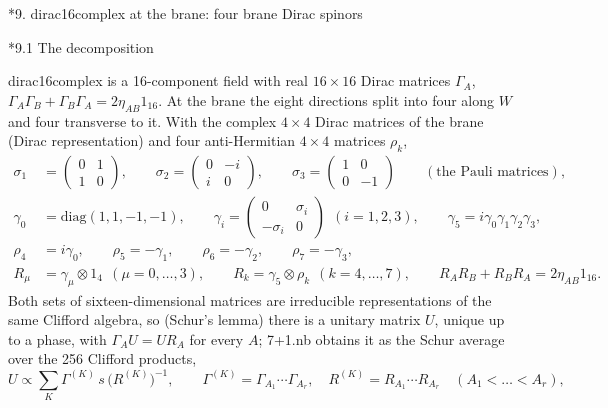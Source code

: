 \documentclass[10pt,a4paper]{article}
\makeatletter
\renewcommand\section{\@startsection{section}{1}{\z@}{-3.5ex \@plus -1ex \@minus -.2ex}{2.3ex \@plus.2ex}{\normalfont\Large\bfseries\raggedright}}
\renewcommand\subsection{\@startsection{subsection}{2}{\z@}{-3.25ex\@plus -1ex \@minus -.2ex}{1.5ex \@plus .2ex}{\normalfont\large\bfseries\raggedright}}
\makeatother
\begin{document}
\section*{9. dirac16complex at the brane: four brane Dirac spinors}
\subsection*{9.1 The decomposition}
dirac16complex is a 16-component field with real $16\times16$ Dirac matrices $\Gamma_A$, $\Gamma_A\Gamma_B+\Gamma_B\Gamma_A=2\eta_{AB}1_{16}$. At the brane the eight directions split into four along $W$ and four transverse to it. With the complex $4\times4$ Dirac matrices of the brane (Dirac representation) and four anti-Hermitian $4\times4$ matrices $\rho_k$,
\begin{align*}
\sigma_1&=\begin{pmatrix}0&1\\1&0\end{pmatrix},\qquad \sigma_2=\begin{pmatrix}0&-i\\i&0\end{pmatrix},\qquad \sigma_3=\begin{pmatrix}1&0\\0&-1\end{pmatrix}\qquad(\text{the Pauli matrices}), \\
\gamma_0&=\mathrm{diag}(1,1,-1,-1),\qquad \gamma_i=\begin{pmatrix}0&\sigma_i\\-\sigma_i&0\end{pmatrix}\ \ (i=1,2,3),\qquad \gamma_5=i\gamma_0\gamma_1\gamma_2\gamma_3, \\
\rho_4&=i\gamma_0,\qquad \rho_5=-\gamma_1,\qquad \rho_6=-\gamma_2,\qquad \rho_7=-\gamma_3, \\
R_\mu&=\gamma_\mu\otimes1_4\ \ (\mu=0,\dots,3),\qquad R_k=\gamma_5\otimes\rho_k\ \ (k=4,\dots,7),\qquad R_AR_B+R_BR_A=2\eta_{AB}1_{16} .
\end{align*}
Both sets of sixteen-dimensional matrices are irreducible representations of the same Clifford algebra, so (Schur’s lemma) there is a unitary matrix $U$, unique up to a phase, with $\Gamma_AU=UR_A$ for every $A$; 7+1.nb obtains it as the Schur average over the 256 Clifford products,
\begin{equation*}
U\propto\sum_{K}\Gamma^{(K)}\,s\,\big(R^{(K)}\big)^{-1},\qquad \Gamma^{(K)}=\Gamma_{A_1}\cdots\Gamma_{A_r},\quad R^{(K)}=R_{A_1}\cdots R_{A_r}\quad(A_1<\dots<A_r),
\end{equation*}
\end{document}
